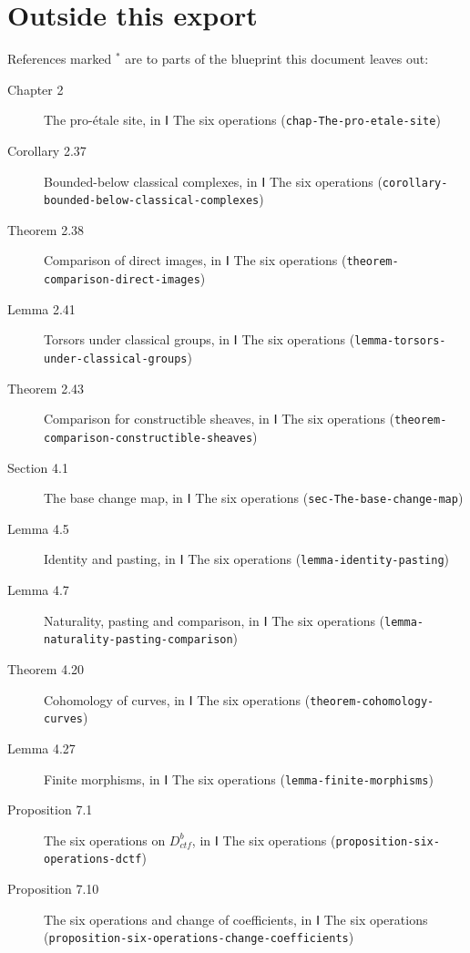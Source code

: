 \documentclass[11pt]{article}
\newcommand{\bpslug}[1]{\texttt{#1}}
\providecommand{\Dctf}{}\renewcommand{\Dctf}{D^b_{ctf}}
\begin{document}
\section*{Outside this export}
References marked \ensuremath{{}^\ast} are to parts of the blueprint this document leaves out:
\begin{description}
\item[Chapter 2] The pro-étale site, in Ⅰ The six operations (\bpslug{chap-{}\allowbreak{}The-{}\allowbreak{}pro-{}\allowbreak{}etale-{}\allowbreak{}site})
\item[Corollary 2.37] Bounded-below classical complexes, in Ⅰ The six operations (\bpslug{corollary-{}\allowbreak{}bounded-{}\allowbreak{}below-{}\allowbreak{}classical-{}\allowbreak{}complexes})
\item[Theorem 2.38] Comparison of direct images, in Ⅰ The six operations (\bpslug{theorem-{}\allowbreak{}comparison-{}\allowbreak{}direct-{}\allowbreak{}images})
\item[Lemma 2.41] Torsors under classical groups, in Ⅰ The six operations (\bpslug{lemma-{}\allowbreak{}torsors-{}\allowbreak{}under-{}\allowbreak{}classical-{}\allowbreak{}groups})
\item[Theorem 2.43] Comparison for constructible sheaves, in Ⅰ The six operations (\bpslug{theorem-{}\allowbreak{}comparison-{}\allowbreak{}constructible-{}\allowbreak{}sheaves})
\item[Section 4.1] The base change map, in Ⅰ The six operations (\bpslug{sec-{}\allowbreak{}The-{}\allowbreak{}base-{}\allowbreak{}change-{}\allowbreak{}map})
\item[Lemma 4.5] Identity and pasting, in Ⅰ The six operations (\bpslug{lemma-{}\allowbreak{}identity-{}\allowbreak{}pasting})
\item[Lemma 4.7] Naturality, pasting and comparison, in Ⅰ The six operations (\bpslug{lemma-{}\allowbreak{}naturality-{}\allowbreak{}pasting-{}\allowbreak{}comparison})
\item[Theorem 4.20] Cohomology of curves, in Ⅰ The six operations (\bpslug{theorem-{}\allowbreak{}cohomology-{}\allowbreak{}curves})
\item[Lemma 4.27] Finite morphisms, in Ⅰ The six operations (\bpslug{lemma-{}\allowbreak{}finite-{}\allowbreak{}morphisms})
\item[Proposition 7.1] The six operations on $\Dctf$, in Ⅰ The six operations (\bpslug{proposition-{}\allowbreak{}six-{}\allowbreak{}operations-{}\allowbreak{}dctf})
\item[Proposition 7.10] The six operations and change of coefficients, in Ⅰ The six operations (\bpslug{proposition-{}\allowbreak{}six-{}\allowbreak{}operations-{}\allowbreak{}change-{}\allowbreak{}coefficients})

\end{description}
\end{document}
